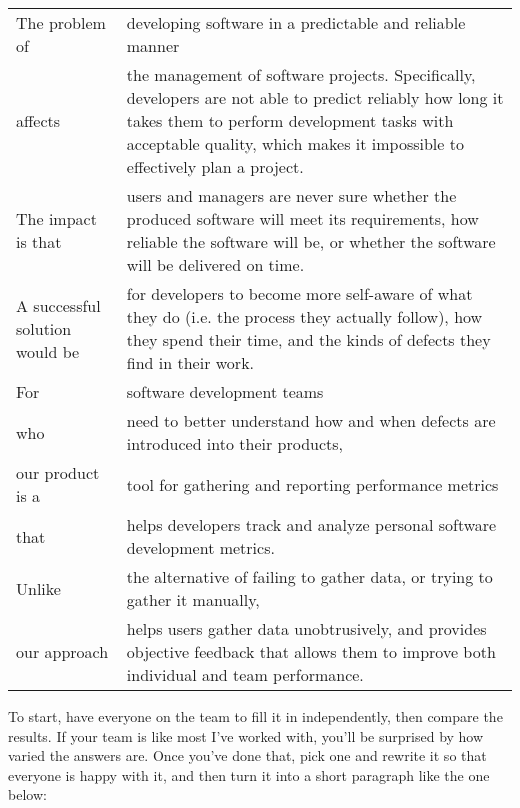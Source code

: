 \documentclass{report}
\begin{document}
\begin{table}
  \begin{tabular}{p{1.5in}p{4in}}

  The problem of
  &
  developing software in a predictable and reliable manner
  \\

  affects
  &
  the management of software projects.  Specifically, developers are
  not able to predict reliably how long it takes them to perform
  development tasks with acceptable quality, which makes it impossible
  to effectively plan a project.
  \\

  The impact is that
  &
  users and managers are never sure whether the produced software will
  meet its requirements, how reliable the software will be, or whether
  the software will be delivered on time.
  \\

  A successful solution would be
  &
  for developers to become more self-aware of what they do (i.e. the
  process they actually follow), how they spend their time, and the
  kinds of defects they find in their work.
  \\

  For
  &
  software development teams
  \\

  who
  &
  need to better understand how and when defects are introduced into
  their products,
  \\

  our product is a
  &
  tool for gathering and reporting performance metrics
  \\

  that
  &
  helps developers track and analyze personal software development
  metrics.
  \\

  Unlike
  &
  the alternative of failing to gather data, or trying to gather it
  manually,
  \\

  our approach
  &
  helps users gather data unobtrusively, and provides objective
  feedback that allows them to improve both individual and team
  performance.
  \\

  \end{tabular}
\end{table}

To start, have everyone on the team to fill it in independently, then
compare the results.  If your team is like most I've worked with,
you'll be surprised by how varied the answers are.  Once you've done
that, pick one and rewrite it so that everyone is happy with it, and
then turn it into a short paragraph like the one below:
\end{document}
